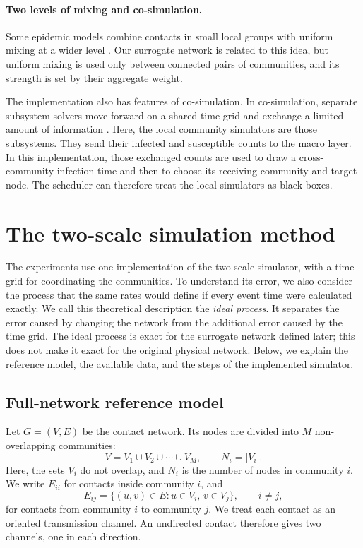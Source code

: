 \documentclass[a4paper,fleqn]{cas-sc}
\begin{document}
\paragraph{Two levels of mixing and co-simulation.}
Some epidemic models combine contacts in small local groups with uniform mixing at a wider level \citep{ball1997}. Our surrogate network is related to this idea, but uniform mixing is used only between connected pairs of communities, and its strength is set by their aggregate weight.

The implementation also has features of co-simulation. In co-simulation, separate subsystem solvers move forward on a shared time grid and exchange a limited amount of information \citep{gomes2018cosim}. Here, the local community simulators are those subsystems. They send their infected and susceptible counts to the macro layer. In this implementation, those exchanged counts are used to draw a cross-community infection time and then to choose its receiving community and target node. The scheduler can therefore treat the local simulators as black boxes.

\clearpage

\section{The two-scale simulation method}
\label{sec:method}

The experiments use one implementation of the two-scale simulator, with a time grid for coordinating the communities. To understand its error, we also consider the process that the same rates would define if every event time were calculated exactly. We call this theoretical description the \emph{ideal process}. It separates the error caused by changing the network from the additional error caused by the time grid. The ideal process is exact for the surrogate network defined later; this does not make it exact for the original physical network. Below, we explain the reference model, the available data, and the steps of the implemented simulator.

\subsection{Full-network reference model}
\label{sec:reference}

Let $G=(V,E)$ be the contact network. Its nodes are divided into $M$ non-overlapping communities:
\begin{equation}
\label{eq:partition}
V=V_1\cup V_2\cup\cdots\cup V_M,
\qquad N_i=|V_i|.
\end{equation}
Here, the sets $V_i$ do not overlap, and $N_i$ is the number of nodes in community $i$. We write $E_{ii}$ for contacts inside community $i$, and
\[
E_{ij}=\{(u,v)\in E:u\in V_i,\,v\in V_j\},
\qquad i\neq j,
\]
for contacts from community $i$ to community $j$. We treat each contact as an oriented transmission channel. An undirected contact therefore gives two channels, one in each direction.
\end{document}
